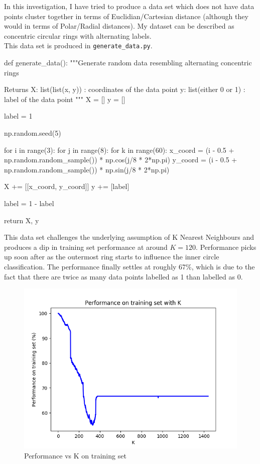 \documentclass{article}
\begin{document}
In this investigation, I have tried to produce a data set which does not have data points cluster together in terms of Euclidian/Cartesian distance (although they would in terms of Polar/Radial distances). My dataset can be described as concentric circular rings with alternating labels.\\

This data set is produced in \texttt{generate\_data.py}.\\

\begin{python}
def generate_data():
    """Generate random data resembling alternating concentric rings

    Returns
    X: list(list(x, y)) : coordinates of the data point
    y: list(either 0 or 1) : label of the data point
    """
    X = []
    y = []

    label = 1

    np.random.seed(5)

    for i in range(3):
        for j in range(8):
            for k in range(60):
                x_coord = (i - 0.5 + np.random.random_sample()) * np.cos(j/8 * 2*np.pi)
                y_coord = (i - 0.5 + np.random.random_sample()) * np.sin(j/8 * 2*np.pi)

                X += [[x_coord, y_coord]]
                y += [label]

        label = 1 - label

    return X, y
\end{python}

This data set challenges the underlying assumption of K Nearest Neighbours and produces a dip in training set performance at around $K=120$. Performance picks up soon after as the outermost ring starts to influence the inner circle classification. The performance finally settles at roughly 67\%, which is due to the fact that there are twice as many data points labelled as 1 than labelled as 0.\\

\begin{figure}[h!]
    \centering
    \includegraphics[scale=1]{performance.png}
    \caption{Performance vs K on training set}
    \label{fig:fig3}
\end{figure}
\end{document}
